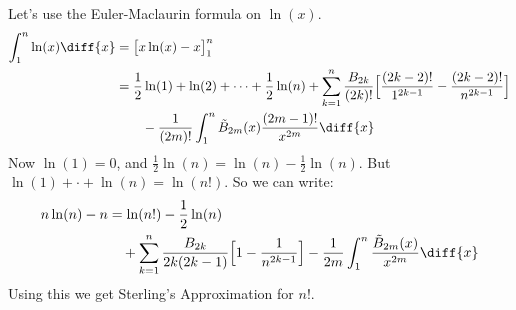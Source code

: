         \begin{lexample}
            Let's use the Euler-Maclaurin formula on $\ln(x)$.
            \begin{align}
                \int_{1}^{n}\ln(x)\diff{x}
                &=\big[x\ln(x)-x\big]_{1}^{n}\\
                \nonumber
                &=\frac{1}{2}\ln(1)+\ln(2)+\cdots+\frac{1}{2}\ln(n)
                    +\sum_{k=1}^{n}\frac{B_{2k}}{(2k)!}
                    \Big[
                        \frac{(2k-2)!}{1^{2k-1}}-\frac{(2k-2)!}{n^{2k-1}}
                    \Big]\\
                &\quad\quad
                    -\frac{1}{(2m)!}\int_{1}^{n}\tilde{B}_{2m}(x)
                    \frac{(2m-1)!}{x^{2m}}\diff{x}
            \end{align}
            Now $\ln(1)=0$, and $\frac{1}{2}\ln(n)=\ln(n)-\frac{1}{2}\ln(n)$.
            But $\ln(1)+\cdot+\ln(n)=\ln(n!)$. So we can write:
            \begin{align}
                \nonumber
                n\ln(n)-n&=\ln(n!)-\frac{1}{2}\ln(n)\\
                &\quad
                    +\sum_{k=1}^{n}\frac{B_{2k}}{2k(2k-1)}
                    \Big[1-\frac{1}{n^{2k-1}}\Big]
                    -\frac{1}{2m}\int_{1}^{n}
                    \frac{\tilde{B}_{2m}(x)}{x^{2m}}\diff{x}
            \end{align}
            Using this we get Sterling's Approximation for $n!$.
        \end{lexample}
